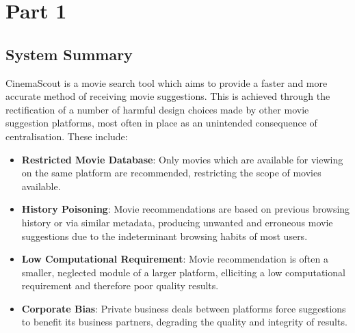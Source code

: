 \documentclass{article}
\begin{document}
\section{Part 1}
\subsection{System Summary}
CinemaScout is a movie search tool which aims to provide a faster and more
accurate method of receiving movie suggestions. This is achieved 
through the rectification of a number of harmful design choices made by other 
movie suggestion platforms, most often in place as an unintended consequence 
of centralisation. These include:
\begin{itemize}
\item \textbf{Restricted Movie Database}: Only movies which are available for
viewing on the same platform are recommended, restricting the scope of movies
available.
\item \textbf{History Poisoning}: Movie recommendations are based on previous
browsing history or via similar metadata, producing unwanted and erroneous
movie suggestions due to the indeterminant browsing habits of most users.
\item \textbf{Low Computational Requirement}: Movie recommendation is often a
smaller, neglected module of a larger platform, elliciting a low computational 
requirement and therefore poor quality results.
\item \textbf{Corporate Bias}: Private business deals between platforms force
suggestions to benefit its business partners, degrading the quality and
integrity of results.
\end{itemize}
\end{document}

